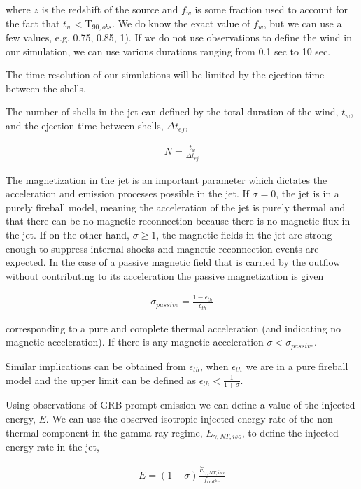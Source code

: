 \documentclass[linenumbers,twocolumn]{aastex631}
\begin{document}
where $z$ is the redshift of the source and $f_w$ is some fraction used to account for the fact that $t_w < $T$_{90,obs}$. We do know the exact value of $f_w$, but we can use a few values, e.g. 0.75, 0.85, 1). If we do not use observations to define the wind in our simulation, we can use various durations ranging from 0.1 sec to 10 sec.

The time resolution of our simulations will be limited by the ejection time between the shells.

The number of shells in the jet can defined by the total duration of the wind, $t_w$, and the ejection time between shells, $\Delta t_{ej}$, 

\begin{align}
	N = \frac{t_w}{\Delta t_{ej}}
\end{align}

The magnetization in the jet is an important parameter which dictates the acceleration and emission processes possible in the jet. If $\sigma=0$, the jet is in a purely fireball model, meaning the acceleration of the jet is purely thermal and that there can be no magnetic reconnection because there is no magnetic flux in the jet. If on the other hand, $\sigma \geq 1$, the magnetic fields in the jet are strong enough to suppress internal shocks and magnetic reconnection events are expected. In the case of a passive magnetic field that is carried by the outflow without contributing to its acceleration \citep{2001A&A...369..694S} the passive magnetization is given

\begin{align}
	\sigma_{passive} = \frac{1-\epsilon_{th}}{\epsilon_{th}}
\end{align} 

corresponding to a pure and complete thermal acceleration (and indicating no magnetic acceleration). If there is any magnetic acceleration $\sigma < \sigma_{passive}$.

Similar implications can be obtained from $\epsilon_{th}$, when $\epsilon_{th}$ we are in a pure fireball model and the upper limit can be defined as $\epsilon_{th}<\frac{1}{1+\sigma}$.

Using observations of GRB prompt emission we can define a value of the injected energy, $\dot{E}$. We can use the observed isotropic injected energy rate of the non-thermal component in the gamma-ray regime, $\dot{E}_{\gamma,NT,iso}$, to define the injected energy rate in the jet, 

\begin{align}
	\dot{E} = (1+\sigma)\frac{\dot{E}_{\gamma,NT,iso}}{f_{rad}\epsilon_e}
\end{align}
\end{document}
